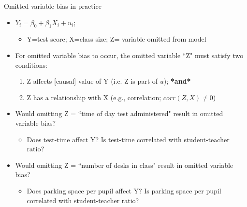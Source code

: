 \begin{frame}{Omitted variable bias in practice}
	\begin{itemize}
	\item $Y_{i} = \beta_{0} + \beta_{1}X_{i} + u_{i}$; 
		\begin{itemize}
		\item Y=test score; X=class size; Z= variable omitted from model
		\end{itemize}
	\item For omitted variable bias to occur, the omitted variable ``Z" must satisfy two conditions:
		\begin{enumerate}
		\item Z affects [causal] value of Y (i.e. Z is part of $u$); \textbf{*and*}
		\item Z has a relationship with X (e.g., correlation; $corr(Z,X) \neq 0$)
		\end{enumerate}
	\item Would omitting Z = ``time of day test administered" result in omitted variable bias?
		\begin{itemize}
		\item Does test-time affect Y? Is test-time correlated with student-teacher ratio?
		\end{itemize}
	\item Would omitting Z = ``number of desks in class" result in omitted variable bias?
		\begin{itemize}
		\item Does parking space per pupil affect Y? Is parking space per pupil correlated with student-teacher ratio?
		\end{itemize}
	\end{itemize}
\end{frame}	

